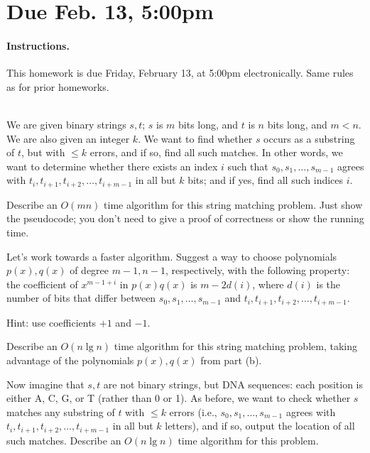 \documentclass[11pt]{article}
\begin{document}
\maketitle

\section*{Due Feb. 13, 5:00pm}

\paragraph*{Instructions.}
This homework is due Friday, February 13, at 5:00pm electronically.
Same rules as for prior homeworks.

\begin{qunlist}

\\
We are given binary strings $s,t$; $s$ is $m$ bits long, and $t$ is $n$ bits long,
and $m<n$.
We are also given an integer $k$.
We want to find whether $s$ occurs as a substring of $t$,
but with $\le k$ errors, and if so, find all such matches.
In other words, we want to determine whether there exists an index $i$
such that $s_0,s_1,\dots,s_{m-1}$ agrees with
$t_i,t_{i+1},t_{i+2},\dots,t_{i+m-1}$ in all but $k$ bits; and if yes,
find all such indices $i$.
\begin{qparts}
\item Describe an $O(mn)$ time algorithm for this string matching problem.
Just show the pseudocode; you don't need to give a proof of correctness
or show the running time.
\item Let's work towards a faster algorithm.
Suggest a way to choose polynomials $p(x),q(x)$ of degree $m-1,n-1$,
respectively, with the following property:
the coefficient of $x^{m-1+i}$ in $p(x)q(x)$ is $m-2d(i)$,
where $d(i)$ is the number of bits that differ between
$s_0,s_1,\dots,s_{m-1}$ and $t_i,t_{i+1},t_{i+2},\dots,t_{i+m-1}$.

Hint: use coefficients $+1$ and $-1$.

\item Describe an $O(n \lg n)$ time algorithm for this string matching problem,
taking advantage of the polynomials $p(x),q(x)$ from part (b).
\item Now imagine that $s,t$ are not binary strings, but DNA sequences:
each position is either A, C, G, or T (rather than 0 or 1).
As before, we want to check whether $s$ matches any substring of $t$
with $\le k$ errors
(i.e., $s_0,s_1,\dots,s_{m-1}$ agrees with
$t_i,t_{i+1},t_{i+2},\dots,t_{i+m-1}$ in all but $k$ letters),
and if so, output the location of all such matches.
Describe an $O(n \lg n)$ time algorithm for this problem.


\end{qparts}
\end{qunlist}
\end{document}
